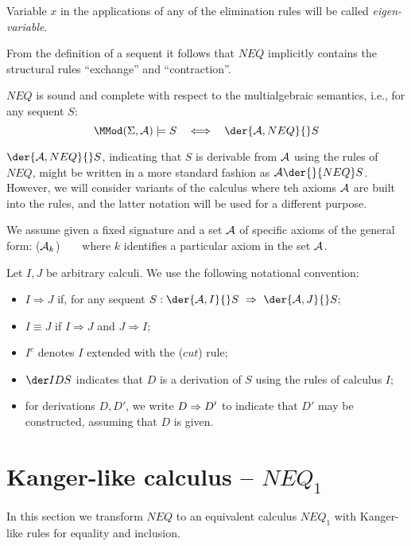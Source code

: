 \noindent
Variable $x$ in the applications of any of the elimination rules will be called
{\em eigen-variable}.
%
\begin{REMARK} \label{re:1}
{From the definition of a sequent it follows that $NEQ$ implicitly contains the 
structural rules ``exchange'' and ``contraction''.}
\end{REMARK}
%
\begin{THEOREM}\label{th:cmpl} {\em \cite{WM}}
$NEQ$ is sound and complete with respect to the multialgebraic semantics, i.e.,
for any sequent $S$:
\[\MMod(\Sigma,\Ax)\models S \ \ \iff \ \ \der{\Ax, NEQ}{}S\]
\end{THEOREM}
\noindent
 $\der{\Ax,NEQ}{}S$,  indicating that $S$ is derivable from ${\cal {A}}$
using the rules of $NEQ$, might be written in a more standard fashion as
 $\Ax\der{}{NEQ}S$. However, we will consider variants of the calculus
 where teh axioms ${\cal {A}}$ are built into the rules, and the latter notation will be used
 for a different purpose.

We  assume given a fixed signature and a set ${\cal {A}}$ of
specific axioms of the general form:
\label{ru:spax}
 (${\cal {A}}_k$)\ \ \ \  where $k$ identifies a particular axiom in the set ${\cal {A}}$.

\begin{DEFINITION} Let $I, J$ be arbitrary
calculi. We use the following notational convention:
\begin{itemize}\MyLPar
\item $I \Rightarrow J$ if, for any sequent $S : \der{\Ax, I}{}S 
\ \Rightarrow\  \der{\Ax, J}{}S;$
\item $I\equiv J$ if $I\Rightarrow J$ and $J\Rightarrow I$;
\item $I^c$ denotes $I$ extended with the 
($cut$) rule;
\item $\der IDS$ indicates that $D$ is a derivation of $S$ 
using the rules of calculus $I$;
\item for derivations $D, D'$, we write $D\mathrel\Rightarrow D'$ to indicate that $D'$
may be constructed, assuming that $D$ is given.
\end{itemize}
\end{DEFINITION}

\section{Kanger-like calculus -- $NEQ_1$}\label{se:neq1}
In this section we transform $NEQ$ to an equivalent calculus $NEQ_1$ 
with Kanger-like rules for equality \cite{K} and inclusion.

